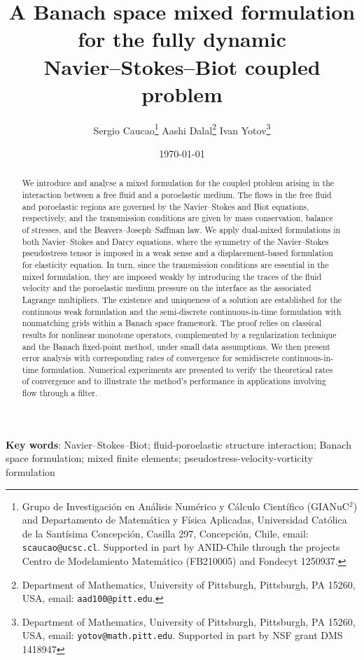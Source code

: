 \documentclass[11pt]{article}
\title{A Banach space mixed formulation for the fully dynamic \\ Navier--Stokes--Biot coupled problem}
\author{{\sc Sergio Caucao}\thanks{Grupo de Investigaci\'on en An\'alisis Num\'erico y C\'alculo Cient\'ifico (GIANuC$^2$) and Departamento de Matem\'atica y F\'isica Aplicadas, 
Universidad Cat\'olica de la Sant\'isima Concepci\'on, Casilla 297, Concepci\'on, Chile, 
email: {\tt scaucao@ucsc.cl}. Supported in part by ANID-Chile through the projects {\sc Centro de Mode\-lamiento Matem\'atico} (FB210005) and Fondecyt 1250937.}
\quad
{\sc Aashi Dalal}\thanks{Department of Mathematics, University of Pittsburgh, Pittsburgh, PA 15260, USA, email: {\tt aad100@pitt.edu}.}
\quad
{\sc Ivan Yotov}\thanks{Department of Mathematics, University of Pittsburgh, Pittsburgh, PA 15260, USA, email: {\tt yotov@math.pitt.edu}. Supported in part by NSF grant DMS 1418947}}
\date{\today}
\numberwithin{equation}{section}
\newcommand{\0}{{\mathbf{0}}}
\numberwithin{equation}{section}
\begin{document}
	
\maketitle

\begin{abstract}
\noindent 
We introduce and analyse a mixed formulation for the coupled problem
arising in the interaction between a free fluid and a poroelastic medium. 
The flows in the free fluid and poroelastic regions are governed by the Navier--Stokes and Biot equations, respectively, and the transmission conditions are given by mass conservation, balance of stresses, and the Beavers--Joseph--Saffman law. 
We apply dual-mixed formulations in both Navier--Stokes and Darcy equations, where the symmetry of the Navier--Stokes pseudostress tensor is imposed in a weak sense and a displacement-based formulation for elasticity equation. 
In turn, since the transmission conditions are essential in the mixed formulation, they are imposed weakly by introducing the traces of the fluid velocity and the poroelastic medium pressure on the interface as the associated Lagrange multipliers. 
The existence and uniqueness of a solution are established for the continuous weak formulation and the semi-discrete continuous-in-time formulation with nonmatching grids within a Banach space framework. 
The proof relies on classical results for nonlinear monotone operators, complemented by a regularization technique and the Banach fixed-point method, under small data assumptions.
We then present error analysis with corresponding rates of convergence for semidiscrete continuous-in-time formulation. 
Numerical experiments are presented to verify the theoretical rates of convergence and to illustrate the method's performance in applications involving flow through a filter.
\end{abstract}
	
\noindent
{\bf Key words}: Navier--Stokes--Biot; fluid-poroelastic structure interaction; Banach space formulation; mixed finite elements; pseudostress-velocity-vorticity formulation
%	
	
\maketitle
	
	
\end{document}
